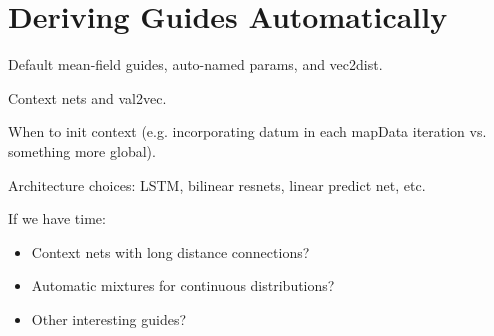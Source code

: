 \section{Deriving Guides Automatically}
\label{sec:autoGuide}

Default mean-field guides, auto-named params, and vec2dist.

Context nets and val2vec.

When to init context (e.g. incorporating datum in each mapData iteration vs. something more global).

Architecture choices: LSTM, bilinear resnets, linear predict net, etc.

If we have time:
\begin{itemize}
\item{Context nets with long distance connections?}
\item{Automatic mixtures for continuous distributions?}
\item{Other interesting guides?}
\end{itemize}


